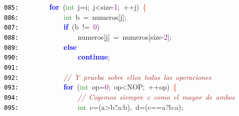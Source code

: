 \documentclass[a4paper,10pt]{scrartcl}
\begin{document}
{   \mbox{}\texttt{\textcolor{Black}{085:}} \ \ \ \ \ \ \ \ \textbf{\textcolor{Blue}{for}}\ \textcolor{BrickRed}{(}\textcolor{ForestGreen}{int}\ j\textcolor{BrickRed}{=}i\textcolor{BrickRed}{;}\ j\textcolor{BrickRed}{\textless{}}size\textcolor{BrickRed}{-}\textcolor{Purple}{1}\textcolor{BrickRed}{;}\ \textcolor{BrickRed}{++}j\textcolor{BrickRed}{)}\ \textcolor{Red}{\{} \\
   \mbox{}\texttt{\textcolor{Black}{086:}} \ \ \ \ \ \ \ \ \ \ \ \ \textcolor{ForestGreen}{int}\ b\ \textcolor{BrickRed}{=}\ numeros\textcolor{BrickRed}{[}j\textcolor{BrickRed}{];} \\
   \mbox{}\texttt{\textcolor{Black}{087:}} \ \ \ \ \ \ \ \ \ \ \ \ \textbf{\textcolor{Blue}{if}}\ \textcolor{BrickRed}{(}b\ \textcolor{BrickRed}{!=}\ \textcolor{Purple}{0}\textcolor{BrickRed}{)} \\
   \mbox{}\texttt{\textcolor{Black}{088:}} \ \ \ \ \ \ \ \ \ \ \ \ \ \ \ \ numeros\textcolor{BrickRed}{[}j\textcolor{BrickRed}{]}\ \textcolor{BrickRed}{=}\ numeros\textcolor{BrickRed}{[}size\textcolor{BrickRed}{-}\textcolor{Purple}{2}\textcolor{BrickRed}{];} \\
   \mbox{}\texttt{\textcolor{Black}{089:}} \ \ \ \ \ \ \ \ \ \ \ \ \textbf{\textcolor{Blue}{else}} \\
   \mbox{}\texttt{\textcolor{Black}{090:}} \ \ \ \ \ \ \ \ \ \ \ \ \ \ \ \ \textbf{\textcolor{Blue}{continue}}\textcolor{BrickRed}{;} \\
   \mbox{}\texttt{\textcolor{Black}{091:}} \ \ \ \ \ \  \\
   \mbox{}\texttt{\textcolor{Black}{092:}} \ \ \ \ \ \ \ \ \ \ \ \ \textit{\textcolor{Brown}{//\ Y\ prueba\ sobre\ ellos\ todas\ las\ operaciones}} \\
   \mbox{}\texttt{\textcolor{Black}{093:}} \ \ \ \ \ \ \ \ \ \ \ \ \textbf{\textcolor{Blue}{for}}\ \textcolor{BrickRed}{(}\textcolor{ForestGreen}{int}\ op\textcolor{BrickRed}{=}\textcolor{Purple}{0}\textcolor{BrickRed}{;}\ op\textcolor{BrickRed}{\textless{}}NOP\textcolor{BrickRed}{;}\ \textcolor{BrickRed}{++}op\textcolor{BrickRed}{)}\ \textcolor{Red}{\{} \\
   \mbox{}\texttt{\textcolor{Black}{094:}} \ \ \ \ \ \ \ \ \ \ \ \ \ \ \ \ \textit{\textcolor{Brown}{//\ Cogemos\ siempre\ c\ como\ el\ mayor\ de\ ambos}} \\
   \mbox{}\texttt{\textcolor{Black}{095:}} \ \ \ \ \ \ \ \ \ \ \ \ \ \ \ \ \textcolor{ForestGreen}{int}\ c\textcolor{BrickRed}{=(}a\textcolor{BrickRed}{\textgreater{}}b\textcolor{BrickRed}{?}a\textcolor{BrickRed}{:}b\textcolor{BrickRed}{),}\ d\textcolor{BrickRed}{=(}c\textcolor{BrickRed}{==}a\textcolor{BrickRed}{?}b\textcolor{BrickRed}{:}a\textcolor{BrickRed}{);} \\
}
\end{document}
